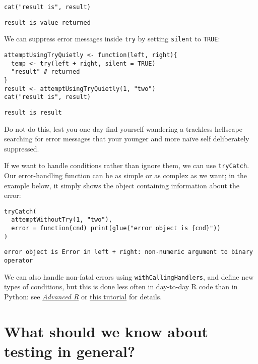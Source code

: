 \begin{lstlisting}
cat("result is", result)
\end{lstlisting}

\begin{lstlisting}
result is value returned
\end{lstlisting}

We can suppress error messages inside \texttt{try}
by setting \texttt{silent} to \texttt{TRUE}:

\begin{lstlisting}
attemptUsingTryQuietly <- function(left, right){
  temp <- try(left + right, silent = TRUE)
  "result" # returned
}
result <- attemptUsingTryQuietly(1, "two")
cat("result is", result)
\end{lstlisting}

\begin{lstlisting}
result is result
\end{lstlisting}

\noindent
Do not do this,
lest you one day find yourself wandering a trackless hellscape
searching for error messages that your younger and more na\"{i}ve self deliberately suppressed.

If we want to handle conditions rather than ignore them,
we can use \texttt{tryCatch}.
Our error-handling function can be as simple or as complex as we want;
in the example below,
it simply shows the object containing information about the error:

\begin{lstlisting}
tryCatch(
  attemptWithoutTry(1, "two"),
  error = function(cnd) print(glue("error object is {cnd}"))
)
\end{lstlisting}

\begin{lstlisting}
error object is Error in left + right: non-numeric argument to binary operator
\end{lstlisting}

\noindent
We can also handle non-fatal errors using \texttt{withCallingHandlers},
and define new types of conditions,
but this is done less often in day-to-day R code than in Python:
see \emph{\href{http://adv-r.had.co.nz/}{Advanced R}}
or \href{https://www.onceupondata.com/2018/09/28/handling-r-errors/}{this tutorial}
for details.

\section{What should we know about testing in general?}

